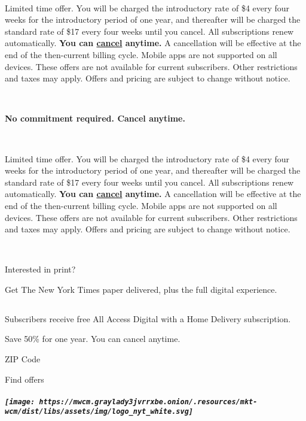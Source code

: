 ~

Limited time offer. You will be charged the introductory rate of \$4
every four weeks for the introductory period of one year, and thereafter
will be charged the standard rate of \$17 every four weeks until you
cancel. All subscriptions renew automatically. \textbf{You can
\href{https://help.nytimes3xbfgragh.onion/hc/en-us/articles/115014893968-Terms-of-sale\#cancel}{cancel}
anytime.} A cancellation will be effective at the end of the
then-current billing cycle. Mobile apps are not supported on all
devices. These offers are not available for current subscribers. Other
restrictions and taxes may apply. Offers and pricing are subject to
change without notice.

~

\textbf{No commitment required. Cancel anytime.}

~

Limited time offer. You will be charged the introductory rate of \$4
every four weeks for the introductory period of one year, and thereafter
will be charged the standard rate of \$17 every four weeks until you
cancel. All subscriptions renew automatically. \textbf{You can
\href{https://help.nytimes3xbfgragh.onion/hc/en-us/articles/115014893968-Terms-of-sale\#cancel}{cancel}
anytime.} A cancellation will be effective at the end of the
then-current billing cycle. Mobile apps are not supported on all
devices. These offers are not available for current subscribers. Other
restrictions and taxes may apply. Offers and pricing are subject to
change without notice.

~

Interested in print?

Get The New York Times paper delivered, plus the full digital
experience.

\hypertarget{-1}{%
\subsection{}\label{-1}}

Subscribers receive free All Access Digital with a Home Delivery
subscription.

Save 50\% for one year. You can cancel anytime.

ZIP Code

\href{/subscription/home-delivery?campaignId=37WXW}{}

Find offers

\hypertarget{the-new-york-times}{%
\subparagraph{\texorpdfstring{\protect\texttt{[image: https://mwcm.graylady3jvrrxbe.onion/.resources/mkt-wcm/dist/libs/assets/img/logo\_nyt\_white.svg]}}{The New York Times}}\label{the-new-york-times}}

